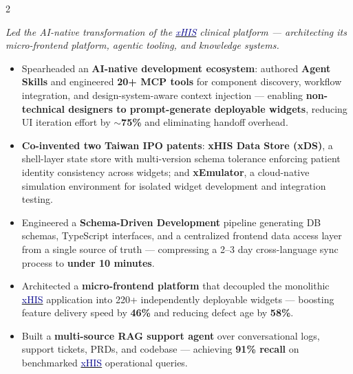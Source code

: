 \documentclass[10pt,a4paper,ragged2e,withhyper]{altacv}
\begin{document}
\begin{paracol}{2}

\textit{Led the AI-native transformation of the \href{https://aics.asus.com/xhis-en/}{\textcolor{DarkBlue}{xHIS}} clinical platform — architecting its micro-frontend platform, agentic tooling, and knowledge systems.}
\begin{itemize}

  \item Spearheaded an \textbf{AI-native development ecosystem}: authored \textbf{Agent Skills} and engineered \textbf{20+ MCP tools} for component discovery, workflow integration, and design-system-aware context injection — enabling \textbf{non-technical designers to prompt-generate deployable widgets}, reducing UI iteration effort by \textbf{$\sim$75\%} and eliminating handoff overhead.

  \item \textbf{Co-invented two Taiwan IPO patents}: \textbf{xHIS Data Store (xDS)}, a shell-layer state store with multi-version schema tolerance enforcing patient identity consistency across widgets; and \textbf{xEmulator}, a cloud-native simulation environment for isolated widget development and integration testing.

  \item Engineered a \textbf{Schema-Driven Development} pipeline generating DB schemas, TypeScript interfaces, and a centralized frontend data access layer from a single source of truth — compressing a 2–3 day cross-language sync process to \textbf{under 10 minutes}.

  \item Architected a \textbf{micro-frontend platform} that decoupled the monolithic \href{https://aics.asus.com/xhis-en/}{\textcolor{DarkBlue}{xHIS}} application into 220+ independently deployable widgets — boosting feature delivery speed by \textbf{46\%} and reducing defect age by \textbf{58\%}.

  \item Built a \textbf{multi-source RAG support agent} over conversational logs, support tickets, PRDs, and codebase — achieving \textbf{91\% recall} on benchmarked \href{https://aics.asus.com/xhis-en/}{\textcolor{DarkBlue}{xHIS}} operational queries.

\end{itemize}

\divider


\end{paracol}
\end{document}
